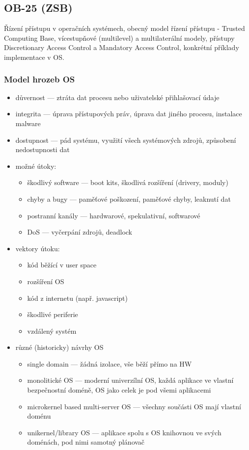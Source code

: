 \subsection{OB-25 (ZSB)}
Řízení přístupu v operačních systémech, obecný model řízení přístupu - Trusted Computing Base, vícestupňové (multilevel) a multilaterální modely, přístupy Discretionary Access Control a Mandatory Access Control, kon\-krét\-ní příklady implementace v OS.

\subsubsection*{Model hrozeb OS}
\begin{itemize}
	\item důvernost --- ztráta dat procesu nebo uživatelské přihlašovací údaje
	\item integrita --- úprava přístupových práv, úprava dat jiného procesu, instalace malware
	\item dostupnost --- pád systému, využití všech systémových zdrojů, způsobení nedostupnosti dat
	\item možné útoky:
	\begin{itemize}
		\item škodlivý software --- boot kits, škodlivá rozšíření (drivery, moduly)
		\item chyby a bugy --- paměťové poškození, paměťové chyby, leaknutí dat
		\item postranní kanály --- hardwarové, spekulativní, softwarové
		\item DoS --- vyčerpání zdrojů, deadlock
	\end{itemize}
	\item vektory útoku:
	\begin{itemize}
		\item kód běžící v user space
		\item rozšíření OS
		\item kód z internetu (např. javascript)
		\item škodlivé periferie
		\item vzdálený systém
	\end{itemize}
	\item různé (historicky) návrhy OS
	\begin{itemize}
		\item single domain --- žádná izolace, vše běží přímo na HW
		\item monolitické OS --- moderní univerzílní OS, každá aplikace ve vlastní bezpečnostní doméně, OS jako celek je pod všemi aplikacemi
		\item microkernel based multi-server OS --- všechny součásti OS mají vlastní doménu
		\item unikernel/library OS --- aplikace spolu s OS knihovnou ve svých doménách, pod nimi samotný plánovač
	\end{itemize}
\end{itemize}

